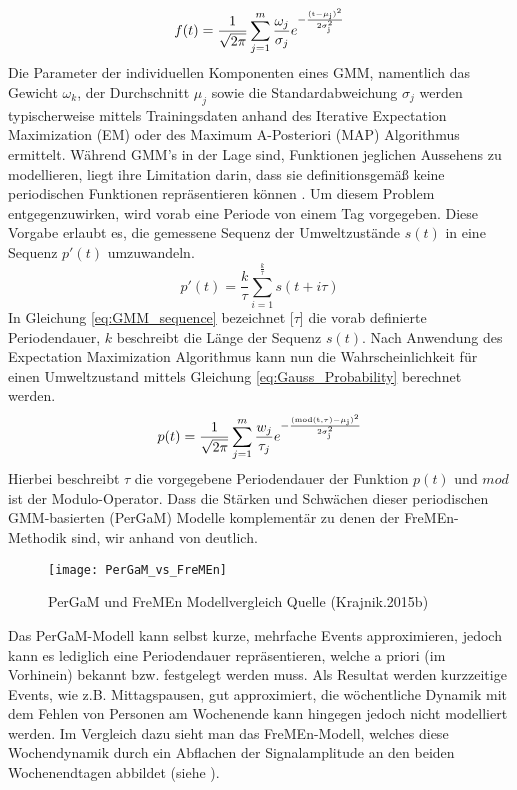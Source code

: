 \begin{equation}
	f(t) = \frac{1}{\sqrt{2 \pi}} \sum_{j=1}^{m} \frac{\omega_j}{\sigma_j} e^{\mathrm{- \frac{(t- \mu_j)^2}{2 \sigma_j ^2}}}
	\label{eq:Gaussian_Mixture_Models}
\end{equation}
Die Parameter der individuellen Komponenten eines GMM, namentlich das Gewicht $\omega_k$, der Durchschnitt $\mu_j$ sowie die Standardabweichung $\sigma_j$ werden typischerweise mittels Trainingsdaten anhand des Iterative Expectation Maximization (EM) oder des Maximum A-Posteriori (MAP) Algorithmus ermittelt. Während GMM's in der Lage sind, Funktionen jeglichen Aussehens zu modellieren, liegt ihre Limitation darin, dass sie definitionsgemäß keine periodischen Funktionen repräsentieren können \cite{Krajnik.2015b}. Um diesem Problem entgegenzuwirken, wird vorab eine Periode von einem Tag vorgegeben. Diese Vorgabe erlaubt es, die gemessene Sequenz der Umweltzustände $s(t)$  in eine Sequenz $p'(t)$ umzuwandeln.
\begin{equation}
	p'(t) = \frac{k}{\tau} \sum_{i=1}^{\frac{k}{\tau}} s(t+i \tau)
	\label{eq:GMM_sequence}
\end{equation}
In Gleichung \ref{eq:GMM_sequence} bezeichnet [$\tau$] die vorab definierte Periodendauer, $k$ beschreibt die Länge der Sequenz $s(t)$. Nach Anwendung des Expectation Maximization Algorithmus kann nun die Wahrscheinlichkeit für einen Umweltzustand mittels Gleichung \ref{eq:Gauss_Probability} berechnet werden. 
\begin{equation}
	p(t) = \frac{1}{\sqrt{2 \pi}} \sum_{j=1}^{m} \frac{w_j}{\tau_j} e ^{\mathrm{- \frac{(mod(t,\tau) - \mu_j)^2}{2 \sigma_j^2}}}
	\label{eq:Gauss_Probability}
\end{equation}
Hierbei beschreibt $\tau$ die vorgegebene Periodendauer der Funktion $p(t)$ und $mod$ ist der Modulo-Operator. Dass die Stärken und Schwächen dieser periodischen GMM-basierten (PerGaM) Modelle komplementär zu denen der FreMEn-Methodik sind, wir anhand von  deutlich.
\begin{figure}[!ht]
	\begin{center}
		\texttt{[image: PerGaM\_vs\_FreMEn]}
		\caption{PerGaM und FreMEn Modellvergleich Quelle (Krajnik.2015b)}
		\label{fig.PerGaM_vs_FreMEn}
	\end{center}
\end{figure}
Das PerGaM-Modell kann selbst kurze, mehrfache Events approximieren, jedoch kann es lediglich eine Periodendauer repräsentieren, welche a priori (im Vorhinein) bekannt bzw. festgelegt werden muss. Als Resultat werden kurzzeitige Events, wie z.B. Mittagspausen, gut approximiert, die wöchentliche Dynamik mit dem Fehlen von Personen am Wochenende kann hingegen jedoch nicht modelliert werden. Im Vergleich dazu sieht man das FreMEn-Modell, welches diese Wochendynamik durch ein Abflachen der Signalamplitude an den beiden Wochenendtagen abbildet (siehe ). \\
